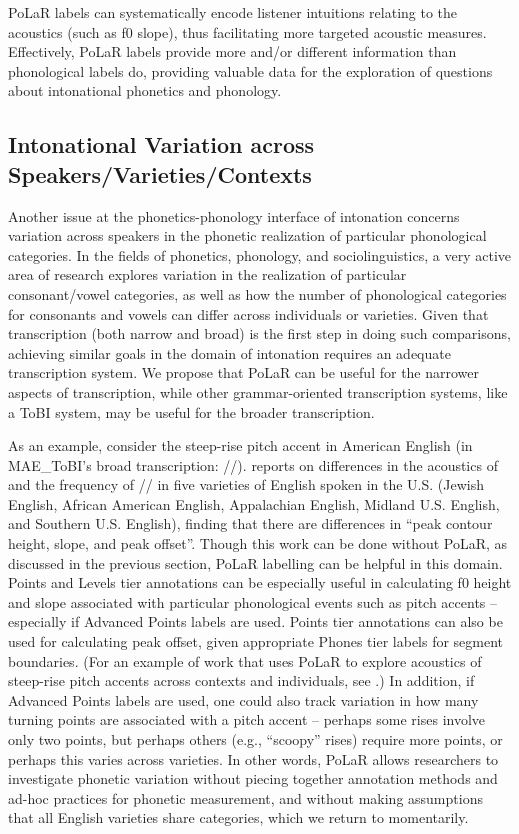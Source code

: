 \documentclass[11pt, twoside]{memoir}
\def\textlabel#1{{\relsize{-.5}\fontspec[Mapping=tex-text]{Roboto Mono}{#1}}}
\begin{document}
PoLaR labels can systematically encode listener intuitions relating to the acoustics (such as f0 slope), thus facilitating more targeted acoustic measures. Effectively, PoLaR labels provide more and/or different information than phonological labels do, providing valuable data for the exploration of questions about intonational phonetics and phonology.

\subsection{Intonational Variation across Speakers\slash Varieties\slash Contexts}\label{sec:interspeaker-variation-in-realization-of-prosodic-categories}

Another issue at the phonetics-phonology interface of intonation concerns variation across speakers in the phonetic realization of particular phonological categories. In the fields of phonetics, phonology, and sociolinguistics, a very active area of research explores variation in the realization of particular consonant\slash vowel categories, as well as how the number of phonological categories for consonants and vowels can differ across individuals or varieties. Given that transcription (both narrow and broad) is the first step in doing such comparisons, achieving similar goals in the domain of intonation requires an adequate transcription system. We propose that PoLaR can be useful for the narrower aspects of transcription, while other grammar-oriented transcription systems, like a ToBI system, may be useful for the broader transcription.

As an example, consider the steep-rise pitch accent in American English (in MAE\_ToBI’s broad transcription: /\textlabel{L+H*}/). \citealt{burdin-18} reports on differences in the acoustics of and the frequency of /\textlabel{L+H*}/ in five varieties of English spoken in the U.S. (Jewish English, African American English, Appalachian English, Midland U.S. English, and Southern U.S. English), finding that there are differences in “peak contour height, slope, and peak offset”. Though this work can be done without PoLaR, as discussed in the previous section, PoLaR labelling can be helpful in this domain. Points and Levels tier annotations can be especially useful in calculating f0 height and slope associated with particular phonological events such as pitch accents – especially if Advanced Points labels are used. Points tier annotations can also be used for calculating peak offset, given appropriate Phones tier labels for segment boundaries. (For an example of work that uses PoLaR to explore acoustics of steep-rise pitch accents across contexts and individuals, see \citealt{holliday21a}.)  In addition, if Advanced Points labels are used, one could also track variation in how many turning points are associated with a pitch accent – perhaps some rises involve only two points, but perhaps others (e.g., “scoopy” rises) require more points, or perhaps this varies across varieties. In other words, PoLaR allows researchers to investigate phonetic variation without piecing together annotation methods and ad-hoc practices for phonetic measurement, and without making assumptions that all English varieties share categories, which we return to momentarily.
\end{document}
